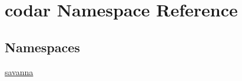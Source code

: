 \hypertarget{namespacecodar}{}\section{codar Namespace Reference}
\label{namespacecodar}
\subsection*{Namespaces}
\begin{DoxyCompactItemize}
\item 
 \hyperlink{namespacecodar_1_1savanna}{savanna}
\end{DoxyCompactItemize}
